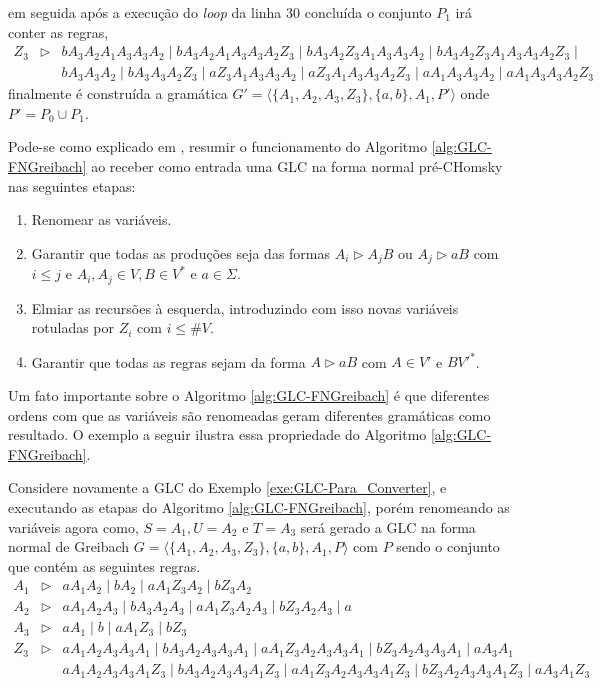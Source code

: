 \begin{example}
    em seguida após a execução do \textit{loop} da linha $30$ concluída o conjunto $P_1$  irá conter as regras, 
    \begin{eqnarray*}
        Z_3 & \rhd & bA_3A_2A_1A_3A_3A_2 \mid bA_3A_2A_1A_3A_3A_2Z_3 \mid bA_3A_2Z_3A_1A_3A_3A_2 \mid bA_3A_2Z_3A_1A_3A_3A_2Z_3 \mid\\
        & & bA_3A_3A_2 \mid bA_3A_3A_2Z_3 \mid  aZ_3A_1A_3A_3A_2 \mid aZ_3A_1A_3A_3A_2Z_3 \mid  aA_1A_3A_3A_2 \mid aA_1A_3A_3A_2Z_3
    \end{eqnarray*}
    finalmente é construída a gramática $G' = \langle \{A_1, A_2, A_3, Z_3\}, \{a, b\}, A_1, P' \rangle$ onde $P' = P_0 \cup P_1$.
    \\
\end{example}

Pode-se como explicado em \cite{benjaLivro2010, menezes1998LFA}, resumir o funcionamento do Algoritmo \ref{alg:GLC-FNGreibach} ao receber como entrada uma GLC na forma normal pré-CHomsky nas seguintes etapas:

\begin{enumerate}
    \item Renomear as variáveis.
    \item Garantir que todas as produções seja das formas $A_i \rhd A_jB$ ou $A_j \rhd aB$ com $i \leq j$ e $A_i, A_j \in V, B \in V^*$ e $a \in \Sigma$.
    \item Elmiar as recursões à esquerda, introduzindo com isso novas variáveis rotuladas por $Z_i$ com $i \leq \#V$.
    \item Garantir que todas as regras sejam da forma $A \rhd aB$ com $A \in V'$ e $B V'^*$.
\end{enumerate}

Um fato importante sobre o Algoritmo \ref{alg:GLC-FNGreibach} é que diferentes ordens com que as variáveis são renomeadas geram diferentes gramáticas como resultado. O exemplo a seguir ilustra essa propriedade do Algoritmo \ref{alg:GLC-FNGreibach}.

\begin{example}
    Considere novamente a GLC do Exemplo \ref{exe:GLC-Para_Converter}, e executando as etapas do Algoritmo \ref{alg:GLC-FNGreibach}, porém renomeando as variáveis agora como, $S = A_1, U = A_2$ e $T = A_3$ será gerado a GLC na forma normal de Greibach $G = \langle \{A_1, A_2, A_3, Z_3\}, \{a, b\}, A_1, P\rangle$ com $P$ sendo o conjunto que contém as seguintes regras.
    \begin{eqnarray*}
        A_1 & \rhd & aA_1A_2 \mid bA_2 \mid aA_1Z_3A_2 \mid bZ_3A_2\\
        A_2 & \rhd & aA_1A_2A_3 \mid bA_3A_2A_3 \mid aA_1Z_3A_2A_3 \mid bZ_3A_2A_3 \mid a\\
        A_3 & \rhd & aA_1 \mid b \mid aA_1Z_3 \mid bZ_3\\
        Z_3 & \rhd & aA_1A_2A_3A_3A_1 \mid bA_3A_2A_3A_3A_1 \mid aA_1Z_3A_2A_3A_3A_1 \mid bZ_3A_2A_3A_3A_1 \mid aA_3A_1\\
        & & aA_1A_2A_3A_3A_1Z_3 \mid bA_3A_2A_3A_3A_1Z_3 \mid aA_1Z_3A_2A_3A_3A_1Z_3 \mid bZ_3A_2A_3A_3A_1Z_3 \mid aA_3A_1Z_3
    \end{eqnarray*}
\end{example}


